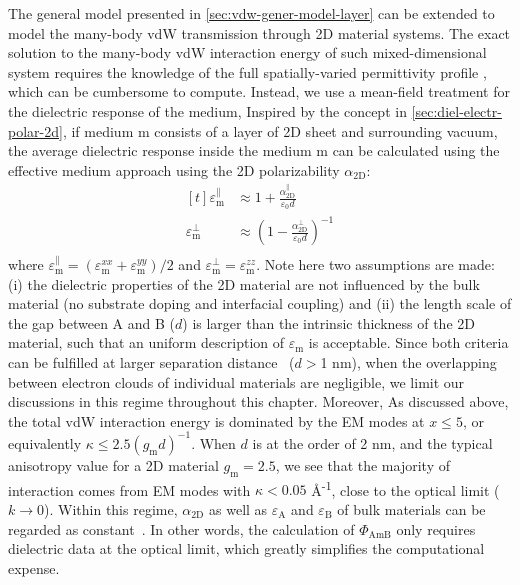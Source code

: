 The general model presented in
\autoref{sec:vdw-gener-model-layer} can be extended to
model the many-body vdW transmission through 2D material systems.
%
The exact solution to the many-body vdW interaction energy of such
mixed-dimensional system requires the knowledge of the full
spatially-varied permittivity profile \cite{Podgornik_2004_continuum},
which can be cumbersome to compute.
%
Instead, we use a mean-field treatment for the dielectric response of
the medium, Inspired by the concept in
\autoref{sec:diel-electr-polar-2d}, if medium m consists of a layer of
2D sheet and surrounding vacuum, the average dielectric response
inside the medium m can be calculated using the effective medium
approach using the 2D polarizability $\alpha_{\mathrm{2D}}$:
\begin{equation}
  \label{eq:vdw-emt-alpha}
  \begin{aligned}[t]
    \varepsilon_{\mathrm{m}}^{\parallel} &\approx 1 + \frac{\alpha_{\mathrm{2D}}^{\parallel}}{\varepsilon_{0} d} \\
        \varepsilon_{\mathrm{m}}^{\perp} &\approx \left(1 - \frac{\alpha_{\mathrm{2D}}^{\perp}}{\varepsilon_{0} d}\right)^{-1} \\
  \end{aligned}
\end{equation}
%
where
$\varepsilon_{\mathrm{m}}^{\parallel} = (\varepsilon_{\mathrm{m}}^{xx}
+ \varepsilon_{\mathrm{m}}^{yy}) / 2$ and
$\varepsilon_{\mathrm{m}}^{\perp} = \varepsilon_{\mathrm{m}}^{zz}$.
Note here two assumptions are made: (i) the dielectric properties of
the 2D material are not influenced by the bulk material (\ie no
substrate doping and interfacial coupling) and (ii) the length scale
of the gap between A and B ($d$) is larger than the intrinsic
thickness of the 2D material, such that an uniform description of
$\varepsilon_{\mathrm{m}}$ is acceptable.
%
Since both criteria can be fulfilled at larger separation
distance~\cite{Dobson_2012_rev} (\eg $d>$1 nm), when the overlapping
between electron clouds of individual materials are negligible, we
limit our discussions in this regime throughout this chapter.
%
Moreover, As discussed above, the total vdW interaction energy is dominated by
the EM modes at $x \leq 5$, or equivalently
\(\kappa \leq 2.5 (g_{\mathrm{m}} d)^{-1}\).
%
When $d$ is at the order of 2 nm, and the typical anisotropy value for
a 2D material $g_{\mathrm{m}}=2.5$, we see that the majority of interaction comes
from EM modes with \(\kappa<0.05\) \AA{}\textsuperscript{-1}, close to the optical limit ($k\to0$).
%
Within this regime, $\alpha_{\mathrm{2D}}$ as well
as $\varepsilon_{\mathrm{A}}$ and $\varepsilon_{\mathrm{B}}$ of bulk
materials can be regarded as
constant~\cite{Li_2005_diele}.
%
In other words, the calculation of $\Phi_{\mathrm{AmB}}$ only requires
dielectric data at the optical limit, which greatly simplifies the
computational expense.

